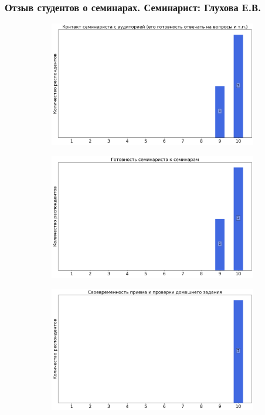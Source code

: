     \subsubsection{Отзыв студентов о семинарах. Семинарист: Глухова Е.В.}
		\begin{figure}[H]
			\centering
			\begin{subfigure}[b]{0.45\textwidth}
				\centering
				\includegraphics[width=\textwidth]{images/2 course/Дифференциальные уравнения/seminarists-marks-Глухова Е.В.-0.png}
			\end{subfigure}
			\begin{subfigure}[b]{0.45\textwidth}
				\centering
				\includegraphics[width=\textwidth]{images/2 course/Дифференциальные уравнения/seminarists-marks-Глухова Е.В.-1.png}
			\end{subfigure}
			\begin{subfigure}[b]{0.45\textwidth}
				\centering
				\includegraphics[width=\textwidth]{images/2 course/Дифференциальные уравнения/seminarists-marks-Глухова Е.В.-2.png}

\end{subfigure}
\end{figure}
